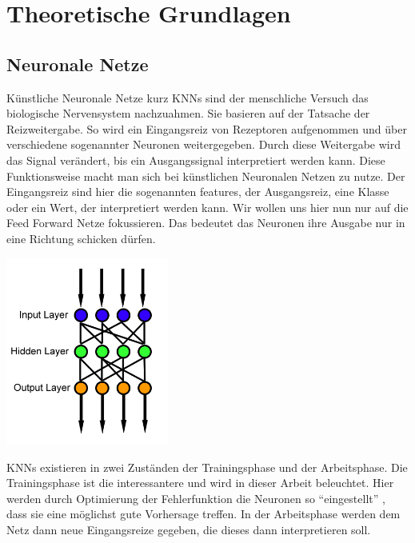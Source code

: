 
\section{Theoretische Grundlagen}\label{Theoretische Grundlagen}


\subsection{Neuronale Netze}\label{Neuronale Netze}

Künstliche Neuronale Netze kurz KNNs sind der menschliche
Versuch das biologische Nervensystem nachzuahmen.
Sie basieren auf der Tatsache der Reizweitergabe. 
So wird ein Eingangsreiz von Rezeptoren aufgenommen 
und über verschiedene sogenannter Neuronen weitergegeben.
Durch diese Weitergabe wird das Signal verändert,
bis ein Ausgangssignal interpretiert werden kann. 
Diese Funktionsweise macht man sich bei künstlichen
Neuronalen Netzen zu nutze.
Der Eingangsreiz sind hier 
die sogenannten \grqq features\grqq{}, 
der Ausgangsreiz, eine Klasse oder ein Wert,
der interpretiert werden kann.
Wir wollen uns hier nun nur auf die \grqq Feed Forward\grqq{}
Netze fokussieren. Das bedeutet das Neuronen ihre Ausgabe
nur in eine Richtung schicken dürfen.


\begin{center}
 \includegraphics[width=0.4\textwidth]{abb/Feed_forward_neural_net.png}
\end{center}


KNNs existieren in zwei Zuständen der Trainingsphase
und der Arbeitsphase. 
Die Trainingsphase ist die interessantere und wird in
dieser Arbeit beleuchtet. Hier werden durch Optimierung 
der Fehlerfunktion die Neuronen so ``eingestellt'' ,
dass sie eine möglichst gute Vorhersage treffen.
In der Arbeitsphase werden dem Netz dann neue Eingangsreize gegeben,
die dieses dann interpretieren soll.


